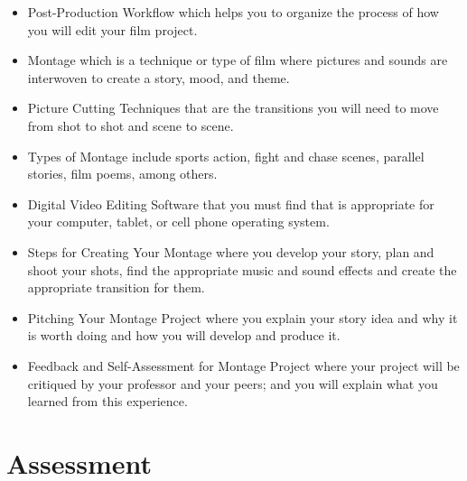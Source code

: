 \documentclass[
]{book}
\providecommand{\tightlist}{%
  \setlength{\itemsep}{0pt}\setlength{\parskip}{0pt}}
\begin{document}
\begin{itemize}
\tightlist
\item
  Post-Production Workflow which helps you to organize the process of how you will edit your film project.
\item
  Montage which is a technique or type of film where pictures and sounds are interwoven to create a story, mood, and theme.
\item
  Picture Cutting Techniques that are the transitions you will need to move from shot to shot and scene to scene.
\item
  Types of Montage include sports action, fight and chase scenes, parallel stories, film poems, among others.
\item
  Digital Video Editing Software that you must find that is appropriate for your computer, tablet, or cell phone operating system.
\item
  Steps for Creating Your Montage where you develop your story, plan and shoot your shots, find the appropriate music and sound effects and create the appropriate transition for them.
\item
  Pitching Your Montage Project where you explain your story idea and why it is worth doing and how you will develop and produce it.
\item
  Feedback and Self-Assessment for Montage Project where your project will be critiqued by your professor and your peers; and you will explain what you learned from this experience.
\end{itemize}

\hypertarget{assessment-13}{%
\section*{Assessment}\label{assessment-13}}
\end{document}
